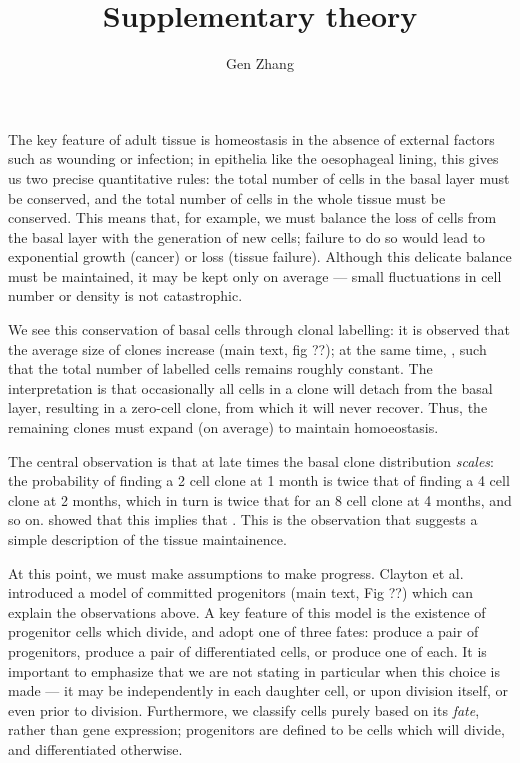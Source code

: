 \documentclass[10pt,UKenglish]{article}
\begin{document}
\title{Supplementary theory}
\author{Gen Zhang}
\date{}
 
\maketitle

\renewcommand{\thesection}{S-\Roman{section}}

The key feature of adult tissue is homeostasis in the absence of external
factors such as wounding or infection; in epithelia like the oesophageal lining,
this gives us two precise quantitative rules: the total number of cells in the
basal layer must be conserved, and the total number of cells in the whole tissue
must be conserved. This means that, for example, we must balance the loss of
cells from the basal layer with the generation of new cells; failure to do so
would lead to exponential growth (cancer) or loss (tissue failure). Although
this delicate balance must be maintained, it may be kept only on average ---
small fluctuations in cell number or density is not catastrophic.

We see this conservation of basal cells through clonal labelling: it is observed
that the average size of clones increase (main text, fig ??); at the same time,
, such that the total number of labelled cells remains roughly
constant. The interpretation is that occasionally all cells in a clone will
detach from the basal layer, resulting in a zero-cell clone, from which it will
never recover. Thus, the remaining clones must expand (on average) to maintain
homoeostasis.

The central observation is that at late times the basal clone distribution
\emph{scales}: the probability of finding a 2 cell clone at 1 month is twice
that of finding a 4 cell clone at 2 months, which in turn is twice that for an 8
cell clone at 4 months, and so on.  showed that this implies that . This is the observation that suggests a simple
description of the tissue maintainence.

At this point, we must make assumptions to make progress. Clayton et al.
introduced a model of committed progenitors (main text, Fig ??) which can
explain the observations above. A key feature of this model is the existence of
progenitor cells which divide, and adopt one of three fates: produce a pair of
progenitors, produce a pair of differentiated cells, or produce one of each. It
is important to emphasize that we are not stating in particular when this choice
is made --- it may be independently in each daughter cell, or upon division
itself, or even prior to division. Furthermore, we classify cells purely based
on its \emph{fate}, rather than gene expression; progenitors are defined to be
cells which will divide, and differentiated otherwise. 
\end{document}
